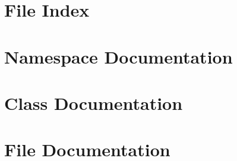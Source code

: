 \let\mypdfximage\pdfximage\def\pdfximage{\immediate\mypdfximage}\documentclass[twoside]{book}
\newcommand{\+}{\discretionary{\mbox{\scriptsize$\hookleftarrow$}}{}{}}
\newcommand{\clearemptydoublepage}{%
  \newpage{\pagestyle{empty}\cleardoublepage}%
}
\begin{document}
\chapter{File Index}

\chapter{Namespace Documentation}



\chapter{Class Documentation}









\chapter{File Documentation}





















\backmatter
\newpage
{}
\clearemptydoublepage
{}
\printindex
\end{document}
